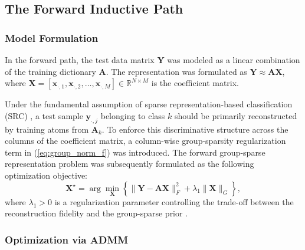 \documentclass[10pt,comsoc]{IEEEtran}
\begin{document}
\subsection{The Forward Inductive Path}
\subsubsection{Model Formulation}
In the forward path, the test data matrix $\mathbf{Y}$ was modeled as a linear combination of the training dictionary $\mathbf{A}$. The representation was formulated as $\mathbf{Y} \approx \mathbf{AX}$, where $\mathbf{X} = [\mathbf{x}_{\cdot,1}, \mathbf{x}_{\cdot,2}, \dots, \mathbf{x}_{\cdot,M}] \in \mathbb{R}^{N \times M}$ is the coefficient matrix. 

Under the fundamental assumption of sparse representation-based classification (SRC) \cite{wright2009robust}, a test sample $\mathbf{y}_{\cdot,j}$ belonging to class $k$ should be primarily reconstructed by training atoms from $\mathbf{A}_k$. To enforce this discriminative structure across the columns of the coefficient matrix, a column-wise group-sparsity regularization term in (\ref{eq:group_norm_f}) was introduced. The forward group-sparse representation problem was subsequently formulated as the following optimization objective:
\begin{equation}
\label{eq:forward_opt}
\mathbf{X}^\star = \arg\min_{\mathbf{X}} \left\{ \|\mathbf{Y} - \mathbf{AX}\|_F^2 + \lambda_1 \|\mathbf{X}\|_G \right\},
\end{equation}
where $\lambda_1 > 0$ is a regularization parameter controlling the trade-off between the reconstruction fidelity and the group-sparse prior \cite{elhamifar2013robust}.

\subsubsection{Optimization via ADMM}
\end{document}

